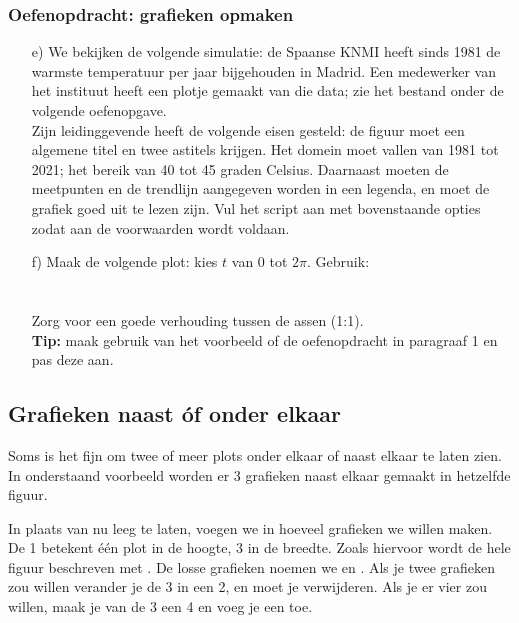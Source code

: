 \documentclass[a4paper,11pt, fleqn]{article}
\begin{document}
\subsubsection*{Oefenopdracht: grafieken opmaken}
\begin{itemize}
	\item[e)] We bekijken de volgende simulatie: de Spaanse KNMI heeft sinds 1981 de warmste temperatuur per jaar bijgehouden in Madrid. Een medewerker van het instituut heeft een plotje gemaakt van die data; zie het bestand onder de volgende oefenopgave. \\
	Zijn leidinggevende heeft de volgende eisen gesteld: de figuur moet een algemene titel en twee astitels krijgen. Het domein moet vallen van 1981 tot 2021; het bereik van 40 tot 45 graden Celsius. Daarnaast moeten de meetpunten en de trendlijn aangegeven worden in een legenda, en moet de grafiek goed uit te lezen zijn. Vul het script aan met bovenstaande opties zodat aan de voorwaarden wordt voldaan.
	
	\item[f)] Maak de volgende plot: kies $t$ van $0$ tot $2\pi$. Gebruik: \\
	\\
	\\
	 Zorg voor een goede verhouding tussen de assen (1:1).\\
	 {\bf Tip:} maak gebruik van het voorbeeld of de oefenopdracht in paragraaf 1 en pas deze aan.
\end{itemize}


\subsection{Grafieken naast \'of onder elkaar}
Soms is het fijn om twee of meer plots onder elkaar of naast elkaar te laten zien. In onderstaand voorbeeld worden er 3 grafieken naast elkaar gemaakt in hetzelfde figuur. 

In plaats van  nu leeg te laten, voegen we in hoeveel grafieken we willen maken. De 1 betekent \'e\'en plot in de hoogte, 3 in de breedte. Zoals hiervoor wordt de hele figuur beschreven met . De losse grafieken noemen we  en . Als je twee grafieken zou willen verander je de 3 in een 2, en moet je  verwijderen. Als je er vier zou willen, maak je van de 3 een 4 en voeg je een  toe.
\end{document}
